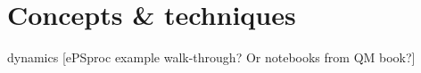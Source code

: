 \section{Concepts \& techniques}

\Photoionization dynamics [ePSproc example walk-through? Or notebooks from QM book?]